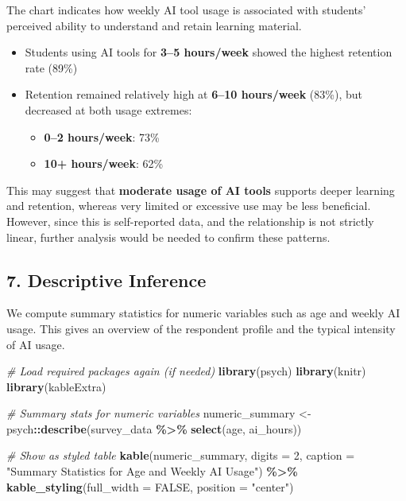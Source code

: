 \documentclass[
]{article}
\newenvironment{Shaded}{\begin{snugshade}}{\end{snugshade}}
\newcommand{\AttributeTok}[1]{\textcolor[rgb]{0.13,0.29,0.53}{#1}}
\newcommand{\CommentTok}[1]{\textcolor[rgb]{0.56,0.35,0.01}{\textit{#1}}}
\newcommand{\ConstantTok}[1]{\textcolor[rgb]{0.56,0.35,0.01}{#1}}
\newcommand{\DecValTok}[1]{\textcolor[rgb]{0.00,0.00,0.81}{#1}}
\newcommand{\FunctionTok}[1]{\textcolor[rgb]{0.13,0.29,0.53}{\textbf{#1}}}
\newcommand{\NormalTok}[1]{#1}
\newcommand{\OtherTok}[1]{\textcolor[rgb]{0.56,0.35,0.01}{#1}}
\newcommand{\SpecialCharTok}[1]{\textcolor[rgb]{0.81,0.36,0.00}{\textbf{#1}}}
\newcommand{\StringTok}[1]{\textcolor[rgb]{0.31,0.60,0.02}{#1}}
\providecommand{\tightlist}{%
  \setlength{\itemsep}{0pt}\setlength{\parskip}{0pt}}
\begin{document}
The chart indicates how weekly AI tool usage is associated with
students' perceived ability to understand and retain learning material.

\begin{itemize}
\tightlist
\item
  Students using AI tools for \textbf{3--5 hours/week} showed the
  highest retention rate (89\%)
\item
  Retention remained relatively high at \textbf{6--10 hours/week}
  (83\%), but decreased at both usage extremes:

  \begin{itemize}
  \tightlist
  \item
    \textbf{0--2 hours/week}: 73\%
  \item
    \textbf{10+ hours/week}: 62\%
  \end{itemize}
\end{itemize}

This may suggest that \textbf{moderate usage of AI tools} supports
deeper learning and retention, whereas very limited or excessive use may
be less beneficial. However, since this is self-reported data, and the
relationship is not strictly linear, further analysis would be needed to
confirm these patterns.

\subsection{7. Descriptive Inference}\label{descriptive-inference}

We compute summary statistics for numeric variables such as age and
weekly AI usage. This gives an overview of the respondent profile and
the typical intensity of AI usage.

\begin{Shaded}
\begin{Highlighting}[]
\CommentTok{\# Load required packages again (if needed)}
\FunctionTok{library}\NormalTok{(psych)}
\FunctionTok{library}\NormalTok{(knitr)}
\FunctionTok{library}\NormalTok{(kableExtra)}

\CommentTok{\# Summary stats for numeric variables}
\NormalTok{numeric\_summary }\OtherTok{\textless{}{-}}\NormalTok{ psych}\SpecialCharTok{::}\FunctionTok{describe}\NormalTok{(survey\_data }\SpecialCharTok{\%\textgreater{}\%} \FunctionTok{select}\NormalTok{(age, ai\_hours))}

\CommentTok{\# Show as styled table}
\FunctionTok{kable}\NormalTok{(numeric\_summary, }\AttributeTok{digits =} \DecValTok{2}\NormalTok{, }\AttributeTok{caption =} \StringTok{"Summary Statistics for Age and Weekly AI Usage"}\NormalTok{) }\SpecialCharTok{\%\textgreater{}\%}
  \FunctionTok{kable\_styling}\NormalTok{(}\AttributeTok{full\_width =} \ConstantTok{FALSE}\NormalTok{, }\AttributeTok{position =} \StringTok{"center"}\NormalTok{)}
\end{Highlighting}
\end{Shaded}
\end{document}
